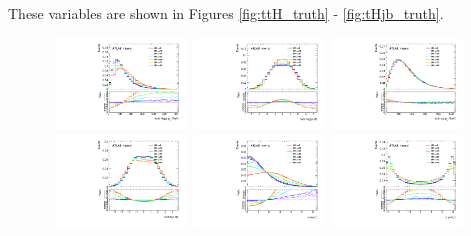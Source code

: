 These variables are shown in Figures \ref{fig:ttH_truth} - \ref{fig:tHjb_truth}.


\begin{figure}[!ht] 
  \begin{center}
    \mbox{ 
      \includegraphics[width=0.31\textwidth]{figures/tthcp_chapter/observables/ttH/c_H_pt.pdf}
      \includegraphics[width=0.31\textwidth]{figures/tthcp_chapter/observables/ttH/c_H_eta.pdf}
      \includegraphics[width=0.31\textwidth]{figures/tthcp_chapter/observables/ttH/c_t_pt.pdf}
    }
    \mbox{ 
      \includegraphics[width=0.31\textwidth]{figures/tthcp_chapter/observables/ttH/c_t_eta.pdf}
      \includegraphics[width=0.31\textwidth]{figures/tthcp_chapter/observables/ttH/c_delta_eta_tt.pdf}
      \includegraphics[width=0.31\textwidth]{figures/tthcp_chapter/observables/ttH/c_delta_phi_tt.pdf}
}
\end{center}
\end{figure}
